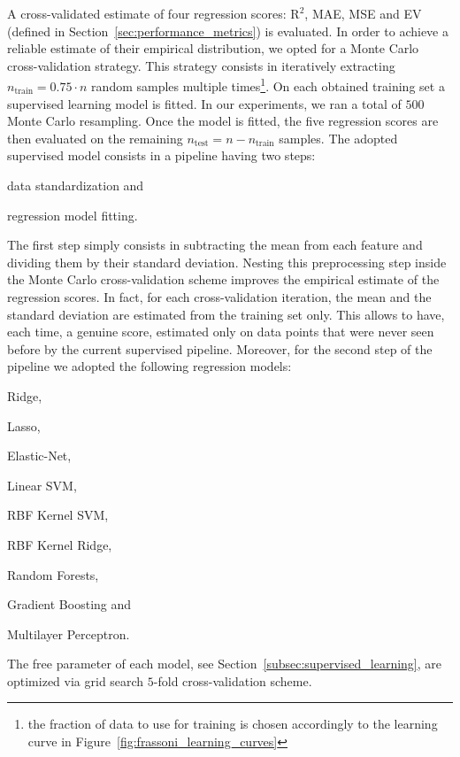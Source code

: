 A cross-validated estimate of four regression scores: $\text{R}^2$, MAE, MSE and EV (defined in Section~\ref{sec:performance_metrics}) is evaluated.
In order to achieve a reliable estimate of their empirical distribution, we opted for a Monte Carlo cross-validation strategy.
This strategy consists in iteratively extracting $n_{\text{train}} = 0.75 \cdot n$ random samples multiple times\footnote{the fraction of data to use for training is chosen accordingly to the learning curve in Figure~\ref{fig:frassoni_learning_curves}}. On each obtained training set a supervised learning model is fitted. In our experiments, we ran a total of $500$ Monte Carlo resampling.
Once the model is fitted, the five regression scores are then evaluated on the remaining $n_{\text{test}} = n - n_{\text{train}}$ samples.
The adopted supervised model consists in a pipeline having two steps:
\begin{enumerate*}[label=(\roman*)]
	\item data standardization and
	\item regression model fitting.
\end{enumerate*}
The first step simply consists in subtracting the mean from each feature and dividing them by their standard deviation. Nesting this preprocessing step inside the Monte Carlo cross-validation scheme improves the empirical estimate of the regression scores. In fact, for each cross-validation iteration, the mean and the standard deviation are estimated from the training set only. This allows to have, each time, a genuine score, estimated only on data points that were never seen before by the current supervised pipeline.
Moreover, for the second step of the pipeline we adopted the following regression models:
\begin{enumerate*}[label=(\alph*)]
	\item Ridge,
	\item Lasso,
	\item Elastic-Net,
	\item Linear SVM,
	\item RBF Kernel SVM,
	\item RBF Kernel Ridge,
	\item Random Forests,
	\item Gradient Boosting and
	\item Multilayer Perceptron.
\end{enumerate*}
The free parameter of each model, see Section~\ref{subsec:supervised_learning}, are optimized via grid search $5$-fold cross-validation scheme.

